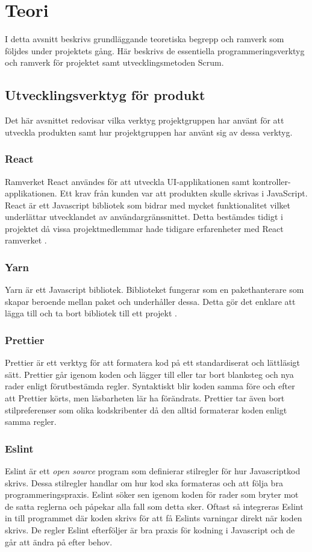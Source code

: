 \chapter{Teori}
\label{cha:theory}
I detta avsnitt beskrivs grundläggande teoretiska begrepp och ramverk som följdes under projektets gång. Här beskrivs de essentiella programmeringsverktyg och ramverk för projektet samt utvecklingsmetoden Scrum. 
\section{Utvecklingsverktyg för produkt}
Det här avsnittet redovisar vilka verktyg projektgruppen har använt för att utveckla produkten samt hur projektgruppen har använt sig av dessa verktyg.

\subsection*{React}
Ramverket React användes för att utveckla UI-applikationen samt kontroller-applikationen. Ett krav från kunden var att produkten skulle skrivas i JavaScript. React är ett Javascript bibliotek som bidrar med mycket funktionalitet vilket underlättar utvecklandet av användargränssnittet.  Detta bestämdes tidigt i projektet då vissa projektmedlemmar hade tidigare erfarenheter med React ramverket \cite{React}.

\subsection*{Yarn}
Yarn är ett Javascript bibliotek. Biblioteket fungerar som en pakethanterare som skapar beroende mellan paket och underhåller dessa. Detta gör det enklare att lägga till och ta bort bibliotek till ett projekt \cite{Yarn}.

\subsection*{Prettier}
Prettier är ett verktyg för att formatera kod på ett standardiserat och lättläsigt sätt\cite{prettier}. Prettier går igenom koden och lägger till eller tar bort blanksteg och nya rader enligt förutbestämda regler. Syntaktiskt blir koden samma före och efter att Prettier körts, men läsbarheten lär ha förändrats. Prettier tar även bort stilpreferenser som olika kodskribenter då den alltid formaterar koden enligt samma regler.


\subsection*{Eslint}
Eslint är ett \textit{open source} program som definierar stilregler för hur Javascriptkod skrivs. Dessa stilregler handlar  om hur kod ska formateras och att följa bra programmeringspraxis. Eslint söker sen igenom koden för rader som bryter mot de satta reglerna och påpekar alla fall som detta sker. Oftast så integreras Eslint in till programmet där koden skrivs för att få Eslints varningar direkt när koden skrivs. De regler Eslint efterföljer är bra praxis för kodning i Javascript och de går att ändra på efter behov.


